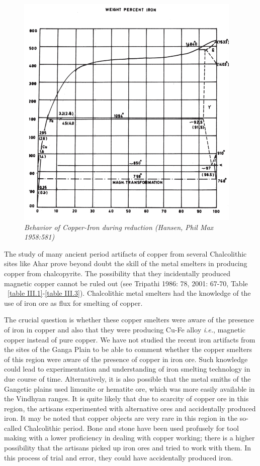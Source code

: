\begin{figure}[H]
\includegraphics[scale=.7]{images/chapter-3/fig001.jpg}
\caption*{\textit{Behavior of Copper-Iron during reduction (Hansen, Phil Max 1958:581)}}\label{chapter2-fig001}
\end{figure}

\vspace{-.4cm}

The study of many ancient period artifacts of copper from several Chalcolithic sites like Ahar prove beyond doubt the skill of the metal smelters in producing copper from chalcopyrite. The possibility that they incidentally produced magnetic copper cannot be ruled out (see Tripathi 1986: 78, 2001: 67-70, Table ~\ref{table III.1}-\ref{table III.3}). Chalcolithic metal smelters had the knowledge of the use of iron ore as flux for smelting of copper. 

The crucial question is whether these copper smelters were aware of the presence of iron in copper and also that they were producing Cu-Fe alloy \textit{i.e.}, magnetic copper instead of pure copper. We have not studied the recent iron artifacts from the sites of the Ganga Plain to be able to comment whether the copper smelters of this region were aware of the presence of copper in iron ore. Such knowledge could lead to experimentation and understanding of iron smelting technology in due course of time. Alternatively, it is also possible that the metal smiths of the Gangetic plains used limonite or hematite ore, which was more easily available in the Vindhyan ranges. It is quite likely that due to scarcity of copper ore in this region, the artisans experimented with alternative ores and accidentally produced iron. It may be noted that copper objects are very rare in this region in the so-called Chalcolithic period. Bone and stone have been used profusely for tool making with a lower proficiency in dealing with copper working; there is a higher possibility that the artisans picked up iron ores and tried to work with them. In this process of trial and error, they could have accidentally produced iron.


